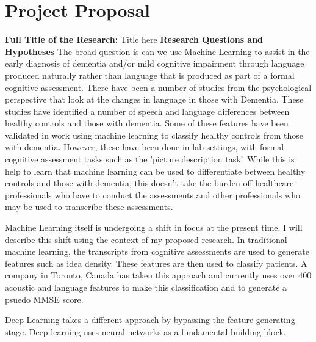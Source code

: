 \documentclass{article}
\begin{document}
\section{Project Proposal}
\textbf{Full Title of the Research:} Title here \newline
\textbf{Research Questions and Hypotheses}
The broad question is can we use Machine Learning to assist in the early diagnosis of dementia and/or mild cognitive impairment through language produced naturally rather than language that is produced as part of a formal cognitive assessment. There have been a number of studies from the psychological perspective that look at the changes in language in those with Dementia. These studies have identified a number of speech and language differences between healthy controls and those with dementia. Some of these features have been validated in work using machine learning to classify healthy controls from those with dementia. However, these have been done in lab settings, with formal cognitive assessment tasks such as the 'picture description task'. While this is help to learn that machine learning can be used to differentiate between healthy controls and those with dementia, this doesn't take the burden off healthcare professionals who have to conduct the assessments and other professionals who may be used to transcribe these assessments. \newline
\par
Machine Learning itself is undergoing a shift in focus at the present time. I will describe this shift using the context of my proposed research. In traditional machine learning, the transcripts from cognitive assessments are used to generate features such as idea density. These features are then used to classify patients. A company in Toronto, Canada has taken this approach and currently uses over 400 acoustic and language features to make this classification and to generate a psuedo MMSE score. \newline
\par
Deep Learning takes a different approach by bypassing the feature generating stage. Deep learning uses neural networks as a fundamental building block.
\end{document}
